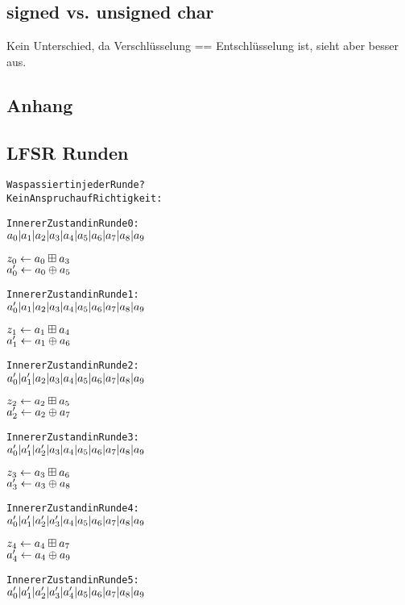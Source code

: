 \documentclass[a4paper,12pt]{article}
\begin{document}
\subsection{signed vs. unsigned char}

Kein Unterschied, da Verschlüsselung == Entschlüsselung ist, sieht aber besser aus.

\newpage
\begin{appendix}

\section{Anhang}
\subsection{LFSR Runden}

\begin{alltt}
Was passiert in jeder Runde?
Kein Anspruch auf Richtigkeit:

Innerer Zustand in Runde 0:
\( a\sb{0} | a\sb{1} | a\sb{2} | a\sb{3} | a\sb{4} | a\sb{5} | a\sb{6} | a\sb{7} | a\sb{8} | a\sb{9} \)

\( z\sb{0} \leftarrow a\sb{0} \boxplus a\sb{3}\)
\( a'\sb{0} \leftarrow a\sb{0} \oplus a\sb{5} \)

Innerer Zustand in Runde 1:
\( a'\sb{0} | a\sb{1} | a\sb{2} | a\sb{3} | a\sb{4} | a\sb{5} | a\sb{6} | a\sb{7} | a\sb{8} | a\sb{9} \)

\( z\sb{1} \leftarrow a\sb{1} \boxplus a\sb{4}\)
\( a'\sb{1} \leftarrow a\sb{1} \oplus a\sb{6} \)

Innerer Zustand in Runde 2:
\( a'\sb{0} | a'\sb{1} | a\sb{2} | a\sb{3} | a\sb{4} | a\sb{5} | a\sb{6} | a\sb{7} | a\sb{8} | a\sb{9} \)

\( z\sb{2} \leftarrow a\sb{2} \boxplus a\sb{5}\)
\( a'\sb{2} \leftarrow a\sb{2} \oplus a\sb{7} \)

Innerer Zustand in Runde 3:
\( a'\sb{0} | a'\sb{1} | a'\sb{2} | a\sb{3} | a\sb{4} | a\sb{5} | a\sb{6} | a\sb{7} | a\sb{8} | a\sb{9} \)

\( z\sb{3} \leftarrow a\sb{3} \boxplus a\sb{6}\)
\( a'\sb{3} \leftarrow a\sb{3} \oplus a\sb{8} \)

Innerer Zustand in Runde 4:
\( a'\sb{0} | a'\sb{1} | a'\sb{2} | a'\sb{3} | a\sb{4} | a\sb{5} | a\sb{6} | a\sb{7} | a\sb{8} | a\sb{9} \)

\( z\sb{4} \leftarrow a\sb{4} \boxplus a\sb{7}\)
\( a'\sb{4} \leftarrow a\sb{4} \oplus a\sb{9} \)

Innerer Zustand in Runde 5:
\( a'\sb{0} | a'\sb{1} | a'\sb{2} | a'\sb{3} | a'\sb{4} | a\sb{5} | a\sb{6} | a\sb{7} | a\sb{8} | a\sb{9} \)


\end{alltt}
\end{appendix}
\end{document}
